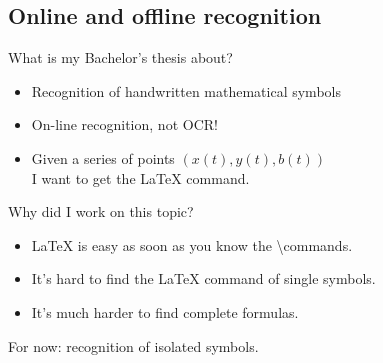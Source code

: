 \subsection{Online and offline recognition}

\begin{frame}{What is my Bachelor's thesis about?}
    \begin{itemize}
        \item Recognition of handwritten mathematical symbols
        \item On-line recognition, not OCR!
        \item Given a series of points $(x(t), y(t), b(t))$\\
              I want to get the \LaTeX{} command.
    \end{itemize}
\end{frame}

\begin{frame}{Why did I work on this topic?}
    \begin{itemize}
        \item \LaTeX{} is easy as soon as you know the \textbackslash{}commands.
        \item It's hard to find the \LaTeX{} command of single symbols.
        \item It's much harder to find complete formulas.
    \end{itemize}

    For now: recognition of isolated symbols.
\end{frame}